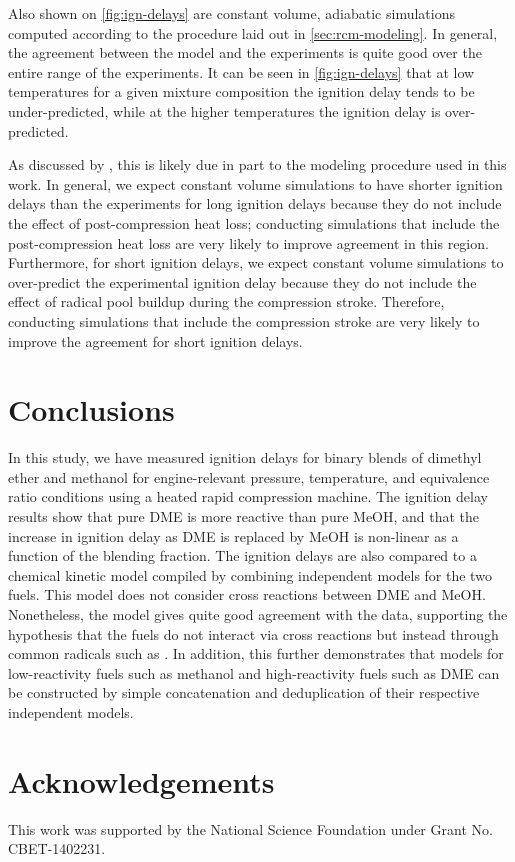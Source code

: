 \documentclass[12pt]{../ussci}
\begin{document}
Also shown on \cref{fig:ign-delays} are constant volume, adiabatic simulations
computed according to the procedure laid out in \cref{sec:rcm-modeling}. In
general, the agreement between the model and the experiments is quite good over
the entire range of the experiments. It can be seen in \cref{fig:ign-delays}
that at low temperatures for a given mixture composition the ignition delay
tends to be under-predicted, while at the higher temperatures the ignition delay
is over-predicted.

As discussed by \textcite{Mittal2008}, this is likely due in part to the
modeling procedure used in this work. In general, we expect constant volume
simulations to have shorter ignition delays than the experiments for long
ignition delays because they do not include the effect of post-compression heat
loss; conducting simulations that include the post-compression heat loss are
very likely to improve agreement in this region. Furthermore, for short ignition
delays, we expect constant volume simulations to over-predict the experimental
ignition delay because they do not include the effect of radical pool buildup
during the compression stroke. Therefore, conducting simulations that include
the compression stroke are very likely to improve the agreement for short
ignition delays.

\section{Conclusions}\label{sec:conclusions}

In this study, we have measured ignition delays for binary blends of dimethyl
ether and methanol for engine-relevant pressure, temperature, and equivalence
ratio conditions using a heated rapid compression machine. The ignition delay
results show that pure DME is more reactive than pure MeOH, and that the
increase in ignition delay as DME is replaced by MeOH is non-linear as a
function of the blending fraction. The ignition delays are also compared to a
chemical kinetic model compiled by combining independent models for the two
fuels. This model does not consider cross reactions between DME and MeOH.
Nonetheless, the model gives quite good agreement with the data, supporting the
hypothesis that the fuels do not interact via cross reactions but instead
through common radicals such as . In addition, this further demonstrates
that models for low-reactivity fuels such as methanol and high-reactivity fuels
such as DME can be constructed by simple concatenation and deduplication of
their respective independent models.

\section{Acknowledgements}\label{acknowledgements}

This work was supported by the National Science Foundation under Grant No.
CBET-1402231.

\printbibliography
\end{document}
